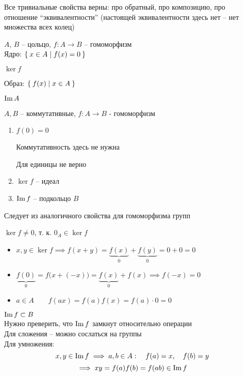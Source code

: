 Все тривиальные свойства верны: про обратный, про композицию, про отношение ``эквивалентности'' (настоящей эквивалентности здесь нет -- нет множества всех колец)

\begin{definition}
	$ A $, $ B $ -- цольцо, $ f : A \to B $ -- гомоморфизм \\
	Ядро: $ \Set{x \in A | f(x) = 0} $
	\begin{notation}
		$ \ker f $
	\end{notation}
	Образ: $ \Set{f(x) | x \in A} $
	\begin{notation}
		$ \operatorname{Im} A $
	\end{notation}
\end{definition}

\begin{properties}
	$ A, B $ -- коммутативные, $ f : A \to B $ - гомоморфизм
	\begin{enumerate}
		\item $ f(0) = 0 $
		\begin{remark}
			Коммутативность здесь не нужна
		\end{remark}
		\begin{remark}
			Для единицы не верно
		\end{remark}

		\item $ \ker f $ -- идеал

		\item $ \operatorname{Im} f $ -- подкольцо $ B $
	\end{enumerate}
\end{properties}

\begin{eproof}
	\item Следует из аналогичного свойства для гомоморфизма групп

	\item $ \ker f \ne 0 $, т. к. $ 0_A \in \ker f $
	\begin{itemize}
		\item $ x, y \in \ker f \implies f(x + y) = \underbrace{f(x)}_0 + \underbrace{f(y)}_0 = 0 + 0 = 0 $
		\item $ \underbrace{f(0)}_0 = f \big( x + (-x) \big) = \underbrace{f(x)}_0 + f(x) \implies f(-x) = 0 $
		\item $ a \in A \qquad f(ax) = f(a)f(x) = f(a) \cdot 0 = 0 $
	\end{itemize}

	\item $ \operatorname{Im} f \subset B $ \\
	Нужно преверить, что $ \operatorname{Im} f $ замкнут относительно операции \\
	Для сложения -- можно сослаться на группы \\
	Для умножения:
	$$ x, y \in \operatorname{Im} f \implies a, b \in A : \quad f(a) = x, \quad f(b) = y $$
	$$ \implies xy = f(a)f(b) = f(ab) \in \operatorname{Im} f $$
\end{eproof}

